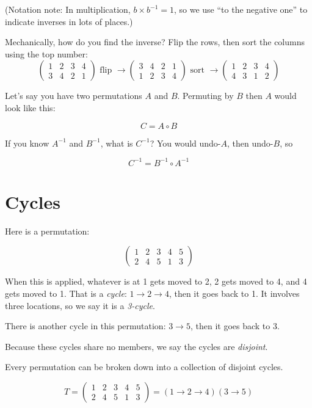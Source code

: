 (Notation note: In multiplication, $b \times b^{-1} = 1$, so we
use ``to the negative one'' to indicate inverses in lots of places.)

Mechanically, how do you find the inverse? Flip the rows, then sort the columns using the top number:
$$\begin{pmatrix}
  1 & 2 & 3 & 4 \\
  3 & 4 & 2 & 1
\end{pmatrix}
\text{ flip }\rightarrow
\begin{pmatrix}
  3 & 4 & 2 & 1 \\
  1 & 2 & 3 & 4
\end{pmatrix}
\text{ sort }\rightarrow
\begin{pmatrix}
  1 & 2 & 3 & 4 \\
  4 & 3 & 1 & 2
\end{pmatrix}
$$    

Let's say you have two permutations $A$ and $B$. Permuting by $B$ then $A$ would look like this:

$$C = A \circ B$$

If you know $A^{-1}$ and $B^{-1}$, what is $C^{-1}$?  You would undo-$A$, then undo-$B$, so

$$C^{-1} = B^{-1} \circ A^{-1}$$

\section{Cycles}

Here is a permutation:

$$\begin{pmatrix}
  1 & 2 & 3 & 4 & 5 \\
  2 & 4 & 5 & 1 & 3
\end{pmatrix}$$

When this is applied, whatever is at 1 gets moved to 2, 2 gets moved
to 4, and 4 gets moved to 1.  That is a \textit{cycle}: $1 \rightarrow
2 \rightarrow 4$, then it goes back to 1. It involves three locations, so we say
it is a \textit{3-cycle}.

There is another cycle in this permutation: $3 \rightarrow 5$, then it goes back to 3.

Because these cycles share no members, we say the cycles are \textit{disjoint}.

Every permutation can be broken down into a collection of disjoint cycles.

$$T = \begin{pmatrix}
  1 & 2 & 3 & 4 & 5 \\
  2 & 4 & 5 & 1 & 3
\end{pmatrix} = (1 \rightarrow 2 \rightarrow 4)(3 \rightarrow 5)$$

